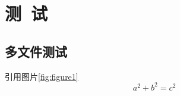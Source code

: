 \documentclass[../../main.tex]{subfiles}
\begin{document}
\chapter{测~试}
\section{多文件测试}
引用图片\ref{fig:figure1}
\begin{equation}
	a^2+b^2=c^2
\end{equation}
\end{document}
